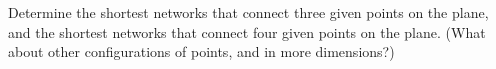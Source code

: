 Determine the shortest networks that connect three given points on the plane,
and the shortest networks that connect four given points on the plane.
\newline (What about other configurations of points, and in more dimensions?)

